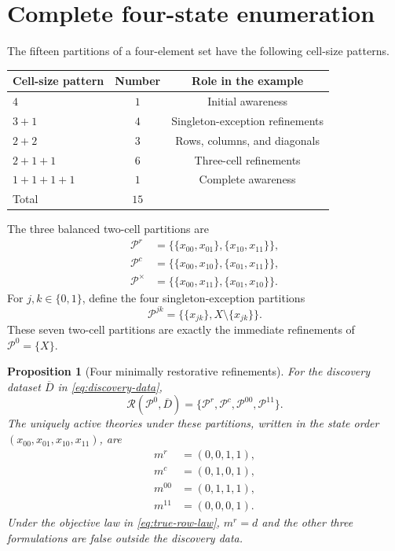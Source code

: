 \documentclass[11pt]{article}
\newtheorem{proposition}[assumption]{Proposition}
\newcommand{\Prow}{\mathcal P^{r}}
\newcommand{\Pcol}{\mathcal P^{c}}
\newcommand{\Pdiag}{\mathcal P^{\times}}
\begin{document}
\section{Complete four-state enumeration}

The fifteen partitions of a four-element set have the following cell-size
patterns.
\begin{center}
\begin{tabular}{@{}lcc@{}}
\toprule
Cell-size pattern & Number & Role in the example\\
\midrule
$4$ & $1$ & Initial awareness\\
$3+1$ & $4$ & Singleton-exception refinements\\
$2+2$ & $3$ & Rows, columns, and diagonals\\
$2+1+1$ & $6$ & Three-cell refinements\\
$1+1+1+1$ & $1$ & Complete awareness\\
\midrule
Total & $15$ & \\
\bottomrule
\end{tabular}
\end{center}

The three balanced two-cell partitions are
\begin{align}
\Prow
&=
\big\{\{x_{00},x_{01}\},\{x_{10},x_{11}\}\big\},
\label{eq:row-partition}\\
\Pcol
&=
\big\{\{x_{00},x_{10}\},\{x_{01},x_{11}\}\big\},
\label{eq:column-partition}\\
\Pdiag
&=
\big\{\{x_{00},x_{11}\},\{x_{01},x_{10}\}\big\}.
\label{eq:diagonal-partition}
\end{align}
For $j,k\in\{0,1\}$, define the four singleton-exception partitions
\begin{equation}
\mathcal P^{jk}
=
\big\{\{x_{jk}\},X\setminus\{x_{jk}\}\big\}.
\label{eq:singleton-partition}
\end{equation}
These seven two-cell partitions are exactly the immediate refinements of
$\mathcal P^0=\{X\}$.

\begin{proposition}[Four minimally restorative refinements]
\label{prop:four-restorations}
For the discovery dataset $\overline D$ in \cref{eq:discovery-data},
\begin{equation}
\mathcal R(\mathcal P^0,\overline D)
=
\{\Prow,\Pcol,\mathcal P^{00},\mathcal P^{11}\}.
\label{eq:restorative-set}
\end{equation}
The uniquely active theories under these partitions, written in the state order
$(x_{00},x_{01},x_{10},x_{11})$, are
\begin{align*}
m^r&=(0,0,1,1),\\
m^c&=(0,1,0,1),\\
m^{00}&=(0,1,1,1),\\
m^{11}&=(0,0,0,1).
\end{align*}
Under the objective law in \cref{eq:true-row-law}, $m^r=d$ and the other three
formulations are false outside the discovery data.
\end{proposition}
\end{document}
